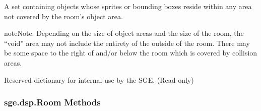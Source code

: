 \documentclass[letterpaper,10pt,english]{sphinxmanual}
\begin{document}
\begin{fulllineitems}

\begin{fulllineitems}
\label{dsp:sge.dsp.Room.object_area_void}
A set containing {\hyperref[dsp:sge.dsp.Object]{\emph{}}} objects whose sprites or
bounding boxes reside within any area not covered by the room's
object area.

\begin{notice}{note}{Note:}
Depending on the size of object areas and the size of the
room, the ``void'' area may not include the entirety of the
outside of the room.  There may be some space to the right of
and/or below the room which is covered by collision areas.
\end{notice}

\end{fulllineitems}


\begin{fulllineitems}
\label{dsp:sge.dsp.Room.rd}
Reserved dictionary for internal use by the SGE.  (Read-only)

\end{fulllineitems}


\end{fulllineitems}



\subsubsection{sge.dsp.Room Methods}
\label{dsp:sge-dsp-room-methods}
\end{document}
